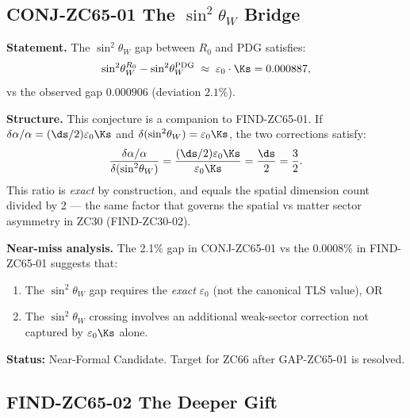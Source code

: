 \documentclass[12pt, a4paper]{article}
\renewcommand{\swsq}{\sin^2\!\theta_W}
\begin{document}
\subsection{CONJ-ZC65-01 \quad The $\swsq$ Bridge}
\label{sec:conj01}


\begin{derivedbox}[title={CONJ-ZC65-01: $\delta(\swsq) = \varepsilon_0\Ks$
  (Candidate, 2.1\%)}]
\textbf{Statement.}
The $\swsq$ gap between $R_0$ and PDG satisfies:
\[
  \swsq^{R_0} - \swsq^{\rm PDG}
  \;\approx\;
  \varepsilon_0\cdot\Ks
  = 0.000887,
\]
vs the observed gap $0.000906$ (deviation $2.1\%$).

\textbf{Structure.}
This conjecture is a companion to FIND-ZC65-01.
If $\delta\alpha/\alpha = (\ds/2)\varepsilon_0\Ks$
and $\delta(\swsq) = \varepsilon_0\Ks$,
the two corrections satisfy:
\[
  \frac{\delta\alpha/\alpha}{\delta(\swsq)}
  = \frac{(\ds/2)\varepsilon_0\Ks}{\varepsilon_0\Ks}
  = \frac{\ds}{2} = \frac{3}{2}.
\]
This ratio is \emph{exact} by construction, and
equals the spatial dimension count divided by 2 ---
the same factor that governs the spatial vs matter
sector asymmetry in ZC30 (FIND-ZC30-02).

\textbf{Near-miss analysis.}
The 2.1\% gap in CONJ-ZC65-01 vs the 0.0008\% in FIND-ZC65-01
suggests that:
\begin{enumerate}[leftmargin=2em, noitemsep]
  \item The $\swsq$ gap requires the \emph{exact}
    $\varepsilon_0$ (not the canonical TLS value), OR
  \item The $\swsq$ crossing involves an additional
    weak-sector correction not captured by $\varepsilon_0\Ks$ alone.
\end{enumerate}

\textbf{Status:} Near-Formal Candidate.
Target for ZC66 after GAP-ZC65-01 is resolved.
\end{derivedbox}

\subsection{FIND-ZC65-02 \quad The Deeper Gift}
\label{sec:find02}
\end{document}
